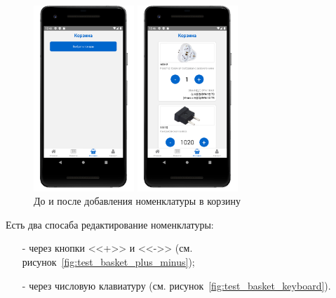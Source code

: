 \begin{figure}[!htb]\centering
    \begin{minipage}{0.32\textwidth}
        \centering

        \includegraphics[height=7cm]
        {images/mobile/basket/basket_0.png}
    \end{minipage}
    \begin{minipage}{0.32\textwidth}
        \centering

        \includegraphics[height=7cm]
        {images/mobile/basket/basket_5.png}
    \end{minipage}

    \caption{До и после добавления номенклатуры в корзину}
    \label{fig:test_basket}
\end{figure}

Есть два спосаба редактирование номенклатуры:
\begin{itemize}
    \item[-] через кнопки <<+>> и <<->> (см. рисунок~\ref{fig:test_basket_plus_minus});
    \item[-] через числовую клавиатуру (см. рисунок~\ref{fig:test_basket_keyboard}).
\end{itemize}

